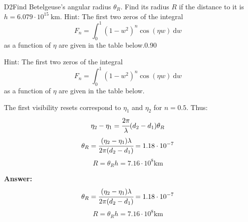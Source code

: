 \documentclass[11pt,a4paper]{article}
\begin{document}
\begin{solcard}{D2}{Find Betelgeuse's angular radius $\theta_R$. Find its radius $R$ if the distance to it is $h=6.079\cdot10^{15}~\mathrm{km}$. Hint: The first two zeros of the integral \[F_n=\int_0^1\left(1-w^2\right)^n\cos(\eta w)~\mathrm dw\] as a function of $\eta$ are given in the table below.}{0.90}

Hint: The first two zeros of the integral \[F_n=\int_0^1\left(1-w^2\right)^n\cos(\eta w)~\mathrm dw\] as a function of $\eta$ are given in the table below.


The first visibility resets correspond to $\eta_1$ and $\eta_2$ for $n = 0.5$. Thus: $$\eta_2 - \eta_1 = \cfrac{2\pi}{\lambda}(d_2 - d_1)\theta_R$$$$\theta_R = \cfrac{(\eta_2 - \eta_1)\lambda}{2\pi(d_2 - d_1)} = 1.18\cdot10^{-7}$$$$R = \theta_Rh = 7.16\cdot10^8 \text{km}$$

\par\smallskip\noindent\textbf{Answer:} $$\theta_R = \cfrac{(\eta_2 - \eta_1)\lambda}{2\pi(d_2 - d_1)} = 1.18\cdot10^{-7}$$$$R = \theta_Rh = 7.16\cdot10^8 \text{km}$$
\end{solcard}
\end{document}

